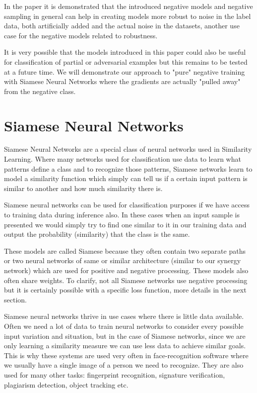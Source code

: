 \documentclass[b5paper]{book}
\begin{document}
In the paper it is demonstrated that the introduced negative models and negative sampling in general can help in creating models more robust to noise in the label data, both artificially added and the actual noise in the datasets, another use case for the negative models related to robustness.

It is very possible that the models introduced in this paper could also be useful for classification of partial or adversarial examples but this remains to be tested at a future time. We will demonstrate our approach to "pure" negative training with Siamese Neural Networks where the gradients are actually "pulled away" from the negative class.

\chapter{Siamese Neural Networks}

Siamese Neural Networks are a special class of neural networks used in Similarity Learning. Where many networks used for classification use data to learn what patterns define a class and to recognize those patterns, Siamese networks learn to model a similarity function which simply can tell us if a certain input pattern is similar to another and how much similarity there is.

Siamese neural networks can be used for classification purposes if we have access to training data during inference also. In these cases when an input sample is presented we would simply try to find one similar to it in our training data and output the probability (similarity) that the class is the same. 

These models are called Siamese because they often contain two separate paths or two neural networks of same or similar architecture (similar to our synergy network) which are used for positive and negative processing. These models also often share weights. To clarify, not all Siamese networks use negative processing but it is certainly possible with a specific loss function, more details in the next section.

Siamese neural networks thrive in use cases where there is little data available. Often we need a lot of data to train neural networks to consider every possible input variation and situation, but in the case of Siamese networks, since we are only learning a similarity measure we can use less data to achieve similar goals. This is why these systems are used very often in face-recognition software where we usually have a single image of a person we need to recognize. They are also used for many other tasks: fingerprint recognition, signature verification, plagiarism detection, object tracking etc.
\end{document}
